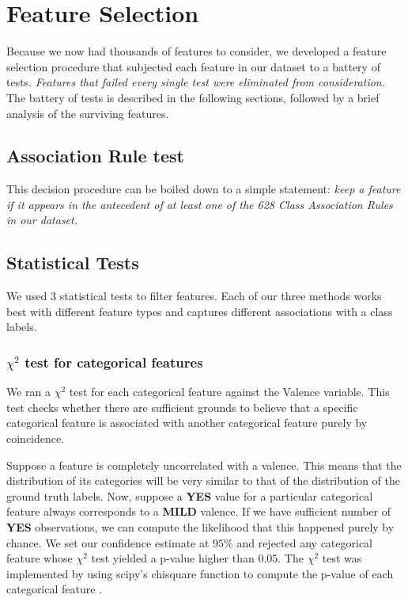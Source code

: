 \chapter{Feature Selection}\label{sec:selection}

Because we now had thousands of features to consider, we developed a
feature selection procedure that subjected each feature in our dataset to a battery of tests. \textit{Features that failed
every single  test were eliminated from consideration}.  
The battery of tests is described in the following sections, followed by a brief analysis of the surviving features.

\section{Association Rule test} This decision procedure can be 
boiled down to a simple statement: \textit{keep a feature if it
appears in the antecedent of at least one of the 628 Class Association Rules
in our dataset.}

\section{Statistical Tests}

We used 3 statistical tests to filter features. Each of our three methods works best with different feature types and captures different associations with a class labels.

\subsection{$\chi^2$ test for categorical features}
We ran a $\chi^2$ test \cite{chisquare} for each categorical feature against the
\textsf{Valence} variable.  This test checks whether there are sufficient
grounds to believe that a specific categorical feature is associated
with another categorical feature purely by coincidence.  

Suppose a feature is completely uncorrelated with a valence. This means
that the distribution of its categories will be very similar to that of 
the distribution of the ground truth labels. Now, suppose a \textbf{YES} value for a particular categorical feature always corresponds to a \textbf{MILD} valence. If we have sufficient number of \textbf{YES} observations, we can compute the likelihood that this happened purely by chance. We
 set our confidence estimate at $95\%$ and rejected any 
categorical feature whose $\chi^2$ test yielded a p-value higher than $0.05$.
The $\chi^2$ test was implemented by using \textsf{scipy}'s
\textsf{chisquare} function to compute the p-value of each categorical feature \cite{scipy}.


